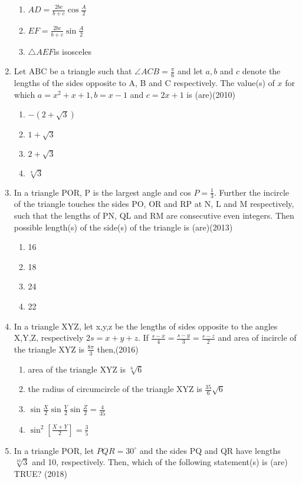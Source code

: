 \documentclass[12pt]{article}
\providecommand{\sbrak}[1]{\ensuremath{{}\left[#1\right]}}
\begin{document}
\begin{enumerate}
\begin{enumerate}
\item $AD=\frac{2bc}{b+c}\cos \frac{A}{2}$
\item $EF=\frac{2bc}{b+c}\sin \frac{A}{2}$
\item $\triangle AEF$is isosceles
\end{enumerate}
\item Let ABC be a triangle such that $\angle ACB=\frac{\pi}{6}$ and let $a,b$ and  $c$ denote the lengths of the sides opposite to A, B and C respectively. The value(s) of $x$ for which $a=x^2+x+1,b=x-1$ and $c=2x+1$ is (are)(2010)
\begin{enumerate}
\item $-(2+\sqrt{3})$
\item $1+\sqrt{3}$
\item $2+\sqrt{3}$
\item $\sqrt[4]{3}$
\end{enumerate}
\item In a triangle POR, P is the largest angle and cos $P=\frac{1}{3}$. Further the incircle of the triangle touches the sides PO, OR and RP at N, L and M respectively, such that the lengths of PN, QL and RM are consecutive even integers. Then possible length(s) of the side(s) of the triangle is (are)(2013)
\begin{enumerate}
\item 16
\item 18
\item 24
\item 22
\end{enumerate}
\item In a triangle XYZ, let x,y,z be the lengths of sides opposite to the angles X,Y,Z, respectively $2s=x+y+z$. If $\frac{s-x}{4}=\frac{s-y}{3}=\frac{s-z}{2}$ and area of incircle of the triangle XYZ is $\frac{8\pi}{3}$ then,(2016)
\begin{enumerate}
\item area of the triangle XYZ is $\sqrt[6]{6}$
\item the radius of circumcircle of the triangle XYZ is $\frac{35}{6}\sqrt{6}$
\item $\sin\frac{X}{2}\sin\frac{Y}{2}\sin\frac{Z}{2}=\frac{4}{35}$
\item $\sin^2\sbrak{\frac{X+Y}{2}}=\frac{3}{5}$
\end{enumerate}
\item In a triangle POR, let $PQR=30^\circ$ and the sides PQ and QR have lengths $\sqrt[10]{3}$ and 10, respectively. Then, which of the following statement(s) is (are) TRUE? (2018)
\begin{enumerate}

\end{enumerate}
\end{enumerate}
\end{document}
